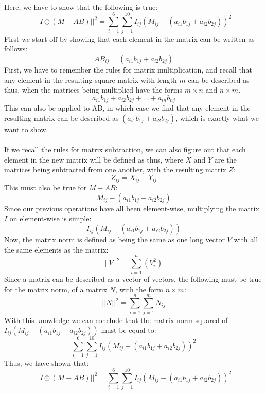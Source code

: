 Here, we have to show that the following is true:
$$||I\odot(M-AB)||^2 = \sum_{i=1}^6\sum_{j=1}^{10} I_{ij}(M_{ij}-(a_{i1}b_{1j}+a_{i2}b_{2j}))^2$$
First we start off by showing that each element in the matrix can be written as follows:
$$AB_{ij} =(a_{i1}b_{1j}+a_{i2}b_{2j})$$
First, we have to remember the rules for matrix multiplication, and recall that any element in the resulting square matrix with length $m$ can be described as thus, when the matrices being multiplied have the forms $m\times n$ and $n \times m$.
$$a_{i1}b_{1j} + a_{i2}b_{2j} + ... + a_{in}b_{nj}$$
This can also be applied to AB, in which case we find that any element in the resulting matrix can be described as $(a_{i1}b_{1j}+a_{i2}b_{2j})$, which is exactly what we want to show.\\
\\
If we recall the rules for matrix subtraction, we can also figure out that each element in the new matrix will be defined as thus, where $X$ and $Y$ are the matrices being subtracted from one another, with the resulting matrix $Z$:
$$Z_{ij} = X_{ij} - Y_{ij}$$
This must also be true for $M-AB$:
$$M_{ij}-(a_{i1}b_{1j}+a_{i2}b_{2j})$$
Since our previous operations have all been element-wise, multiplying the matrix $I$ on element-wise is simple:
$$I_{ij}(M_{ij}-(a_{i1}b_{1j}+a_{i2}b_{2j}))$$
Now, the matrix norm is defined as being the same as one long vector $V$ with all the same elements as the matrix:
$$||V||^2 = \sum_{i=1}^{n}(V_i^2)$$
Since a matrix can be described as a vector of vectors, the following must be true for the matrix norm, of a matrix $N$, with the form $n\times m$:
$$||N||^2 = \sum_{i=1}^n\sum_{j=1}^mN_{ij}$$
With this knowledge we can conclude that the matrix norm squared of $I_{ij}(M_{ij}-(a_{i1}b_{1j}+a_{i2}b_{2j}))$ must be equal to:
$$\sum_{i=1}^6\sum_{j=1}^{10} I_{ij}(M_{ij}-(a_{i1}b_{1j}+a_{i2}b_{2j}))^2$$
Thus, we have shown that: $$||I\odot(M-AB)||^2 = \sum_{i=1}^6\sum_{j=1}^{10} I_{ij}(M_{ij}-(a_{i1}b_{1j}+a_{i2}b_{2j}))^2$$	